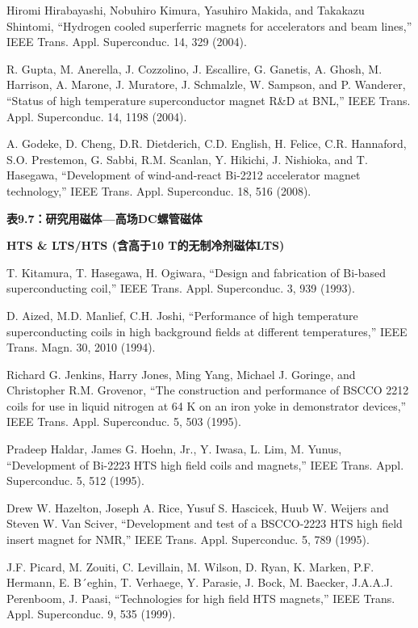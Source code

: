 \noindent [9.339] Hiromi Hirabayashi, Nobuhiro Kimura, Yasuhiro Makida, and Takakazu Shintomi,
``Hydrogen cooled superferric magnets for accelerators and beam lines,”
IEEE Trans. Appl. Superconduc. 14, 329 (2004).

\noindent [9.340] R. Gupta, M. Anerella, J. Cozzolino, J. Escallire, G. Ganetis, A. Ghosh, M. Harrison,
A. Marone, J. Muratore, J. Schmalzle, W. Sampson, and P. Wanderer,
``Status of high temperature superconductor magnet R\&D at BNL,” IEEE Trans.
Appl. Superconduc. 14, 1198 (2004).

\noindent [9.341] A. Godeke, D. Cheng, D.R. Dietderich, C.D. English, H. Felice, C.R. Hannaford,
S.O. Prestemon, G. Sabbi, R.M. Scanlan, Y. Hikichi, J. Nishioka, and T. Hasegawa,
``Development of wind-and-react Bi-2212 accelerator magnet technology,”
IEEE Trans. Appl. Superconduc. 18, 516 (2008).

\noindent \textbf{表9.7：研究用磁体---高场DC螺管磁体}

\noindent \textbf{HTS \& LTS/HTS (含高于10 T的无制冷剂磁体LTS)}

\noindent [9.342] T. Kitamura, T. Hasegawa, H. Ogiwara, ``Design and fabrication of Bi-based
superconducting coil,” IEEE Trans. Appl. Superconduc. 3, 939 (1993).

\noindent [9.343] D. Aized, M.D. Manlief, C.H. Joshi, ``Performance of high temperature superconducting
coils in high background fields at different temperatures,” IEEE Trans.
Magn. 30, 2010 (1994).

\noindent [9.344] Richard G. Jenkins, Harry Jones, Ming Yang, Michael J. Goringe, and Christopher
R.M. Grovenor, ``The construction and performance of BSCCO 2212 coils
for use in liquid nitrogen at 64 K on an iron yoke in demonstrator devices,” IEEE
Trans. Appl. Superconduc. 5, 503 (1995).

\noindent [9.345] Pradeep Haldar, James G. Hoehn, Jr., Y. Iwasa, L. Lim, M. Yunus, ``Development
of Bi-2223 HTS high field coils and magnets,” IEEE Trans. Appl. Superconduc.
5, 512 (1995).

\noindent [9.346] Drew W. Hazelton, Joseph A. Rice, Yusuf S. Hascicek, Huub W. Weijers and
Steven W. Van Sciver, ``Development and test of a BSCCO-2223 HTS high field
insert magnet for NMR,” IEEE Trans. Appl. Superconduc. 5, 789 (1995).

\noindent [9.347] J.F. Picard, M. Zouiti, C. Levillain, M. Wilson, D. Ryan, K. Marken, P.F. Hermann,
E. B´eghin, T. Verhaege, Y. Parasie, J. Bock, M. Baecker, J.A.A.J. Perenboom,
J. Paasi, ``Technologies for high field HTS magnets,” IEEE Trans. Appl.
Superconduc. 9, 535 (1999).

